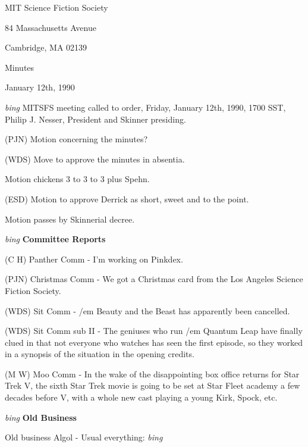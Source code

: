 \setlength{\topmargin}{-0.5in}
\setlength{\oddsidemargin}{-0.60in}
\setlength{\textheight}{9in}
\setlength{\textwidth}{6.5in}



\begin{center}
MIT Science Fiction Society

84 Massachusetts Avenue

Cambridge, MA 02139

\vspace{0.2in}
Minutes

January 12th, 1990

\end{center}
 
\vspace{0.15in}
{\em bing\/}  MITSFS meeting called to order, Friday, January 12th, 1990,
1700 SST, Philip J. Nesser, President and Skinner presiding.

(PJN) Motion concerning the minutes?

(WDS) Move to approve the minutes in absentia.

Motion chickens 3 to 3 to 3 plus Spehn.

(ESD) Motion to approve Derrick as short, sweet and to the point.

Motion passes by Skinnerial decree.

\vspace{0.15in}
{\em bing\/}  {\bf Committee Reports}

(C H) Panther Comm - I'm working on Pinkdex.

(PJN) Christmas Comm - We got a Christmas card from the Los Angeles
Science Fiction Society.

(WDS) Sit Comm - {/em Beauty and the Beast} has apparently been
cancelled.

(WDS) Sit Comm sub II - The geniuses who run {/em Quantum Leap} have
finally clued in that not everyone who watches has seen the first
episode, so they worked in a synopsis of the situation in the opening
credits.

(M W) Moo Comm - In the wake of the disappointing box office returns
for Star Trek V, the sixth Star Trek movie is going to be set at Star
Fleet academy a few decades before V, with a whole new cast playing a
young Kirk, Spock, etc. 

\vspace{0.15in}
{\em bing\/}  {\bf Old Business}

Old business Algol - Usual everything: {\em bing\/}

